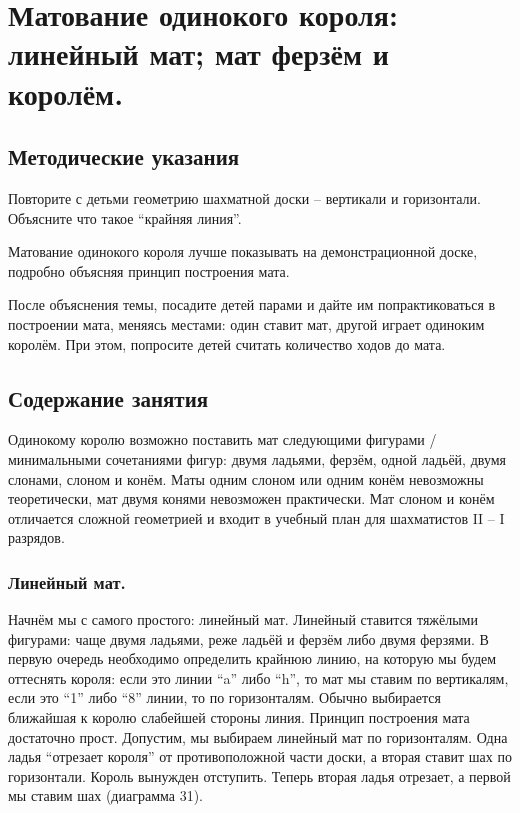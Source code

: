 \chapter{Матование одинокого короля: линейный мат; мат ферзём и королём.}

\section{Методические указания}

Повторите с детьми геометрию шахматной доски -- вертикали и горизонтали. Объясните что такое ``крайняя линия''.

Матование одинокого короля лучше показывать на демонстрационной доске, подробно объясняя принцип построения мата.

После объяснения темы, посадите детей парами и дайте им попрактиковаться в построении мата, меняясь местами: один ставит мат, другой играет одиноким королём. При этом, попросите детей считать количество ходов до мата.

\section{Содержание занятия}

Одинокому королю возможно поставить мат следующими фигурами / минимальными сочетаниями фигур: двумя ладьями, ферзём, одной ладьёй, двумя слонами, слоном и конём. Маты одним слоном или одним конём невозможны теоретически, мат двумя конями невозможен практически. Мат слоном и конём отличается сложной геометрией и входит в учебный план для шахматистов II – I разрядов.

\subsection*{Линейный мат.}

Начнём мы с самого простого: линейный мат. Линейный ставится тяжёлыми фигурами: чаще двумя ладьями, реже ладьёй и ферзём либо двумя ферзями. В первую очередь необходимо определить крайнюю линию, на которую мы будем оттеснять короля: если это линии ``a'' либо ``h'', то мат мы ставим по вертикалям, если это ``1'' либо ``8'' линии, то по горизонталям. Обычно выбирается ближайшая к королю слабейшей стороны линия. Принцип построения мата достаточно прост. Допустим, мы выбираем линейный мат по горизонталям. Одна ладья ``отрезает короля'' от противоположной части доски, а вторая ставит шах по горизонтали. Король вынужден отступить. Теперь вторая ладья отрезает, а первой мы ставим шах (диаграмма 31). 
 

